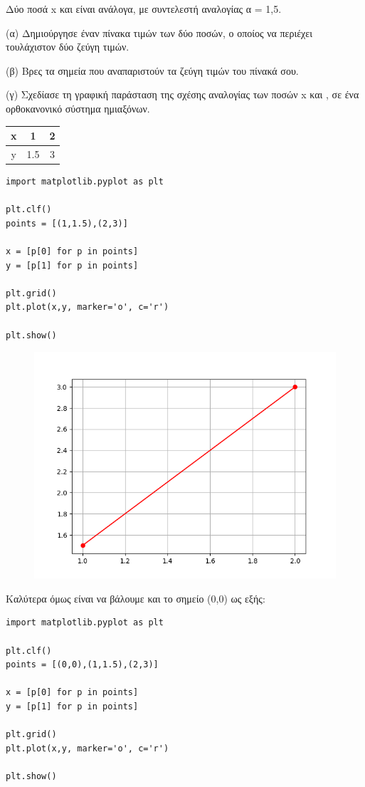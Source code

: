 \begin{exercise}
Δύο  ποσά  x και  είναι ανάλογα, με συντελεστή αναλογίας α = 1,5. 

(α)	Δημιούργησε έναν πίνακα τιμών των δύο ποσών, ο οποίος να περιέχει  τουλάχιστον δύο  ζεύγη τιμών. 

(β) Βρες τα σημεία που αναπαριστούν τα ζεύγη τιμών του πίνακά σου. 

(γ)  Σχεδίασε τη γραφική παράσταση της σχέσης αναλογίας των ποσών x και , σε  ένα ορθοκανονικό σύστημα ημιαξόνων.
\end{exercise}
\begin{table}
\begin{tabular}{|c|c|c|}
\hline
x&1&2\\\hline
y&1.5&3\\\hline
\end{tabular}
\end{table}
\begin{lstlisting}
import matplotlib.pyplot as plt

plt.clf()
points = [(1,1.5),(2,3)]

x = [p[0] for p in points]
y = [p[1] for p in points]

plt.grid()
plt.plot(x,y, marker='o', c='r')

plt.show()
\end{lstlisting}
\begin{figure}
\includegraphics{sel101_1.png}
\end{figure}
Καλύτερα όμως είναι να βάλουμε και το σημείο (0,0) ως εξής:
\begin{lstlisting}
import matplotlib.pyplot as plt

plt.clf()
points = [(0,0),(1,1.5),(2,3)]

x = [p[0] for p in points]
y = [p[1] for p in points]

plt.grid()
plt.plot(x,y, marker='o', c='r')

plt.show()
\end{lstlisting}
